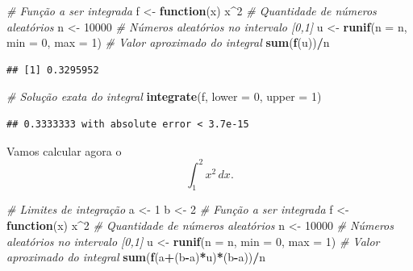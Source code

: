 \documentclass[
]{book}
\newenvironment{Shaded}{\begin{snugshade}}{\end{snugshade}}
\newcommand{\AttributeTok}[1]{\textcolor[rgb]{0.13,0.29,0.53}{#1}}
\newcommand{\CommentTok}[1]{\textcolor[rgb]{0.56,0.35,0.01}{\textit{#1}}}
\newcommand{\ControlFlowTok}[1]{\textcolor[rgb]{0.13,0.29,0.53}{\textbf{#1}}}
\newcommand{\DecValTok}[1]{\textcolor[rgb]{0.00,0.00,0.81}{#1}}
\newcommand{\FunctionTok}[1]{\textcolor[rgb]{0.13,0.29,0.53}{\textbf{#1}}}
\newcommand{\NormalTok}[1]{#1}
\newcommand{\OtherTok}[1]{\textcolor[rgb]{0.56,0.35,0.01}{#1}}
\newcommand{\SpecialCharTok}[1]{\textcolor[rgb]{0.81,0.36,0.00}{\textbf{#1}}}
\begin{document}
\begin{Shaded}
\begin{Highlighting}[]
\CommentTok{\# Função a ser integrada}
\NormalTok{f }\OtherTok{\textless{}{-}} \ControlFlowTok{function}\NormalTok{(x) x}\SpecialCharTok{\^{}}\DecValTok{2}
\CommentTok{\# Quantidade de números aleatórios}
\NormalTok{n }\OtherTok{\textless{}{-}} \DecValTok{10000}
\CommentTok{\# Números aleatórios no intervalo [0,1]}
\NormalTok{u }\OtherTok{\textless{}{-}} \FunctionTok{runif}\NormalTok{(}\AttributeTok{n =}\NormalTok{ n, }\AttributeTok{min =} \DecValTok{0}\NormalTok{, }\AttributeTok{max =} \DecValTok{1}\NormalTok{)}
\CommentTok{\# Valor aproximado do integral}
\FunctionTok{sum}\NormalTok{(}\FunctionTok{f}\NormalTok{(u))}\SpecialCharTok{/}\NormalTok{n}
\end{Highlighting}
\end{Shaded}

\begin{verbatim}
## [1] 0.3295952
\end{verbatim}

\begin{Shaded}
\begin{Highlighting}[]
\CommentTok{\# Solução exata do integral}
\FunctionTok{integrate}\NormalTok{(f, }\AttributeTok{lower =} \DecValTok{0}\NormalTok{, }\AttributeTok{upper =} \DecValTok{1}\NormalTok{)}
\end{Highlighting}
\end{Shaded}

\begin{verbatim}
## 0.3333333 with absolute error < 3.7e-15
\end{verbatim}

Vamos calcular agora o \[\int_{1}^{2} x^2\, dx.\]

\begin{Shaded}
\begin{Highlighting}[]
\CommentTok{\# Limites de integração}
\NormalTok{a }\OtherTok{\textless{}{-}} \DecValTok{1}
\NormalTok{b }\OtherTok{\textless{}{-}} \DecValTok{2}
\CommentTok{\# Função a ser integrada}
\NormalTok{f }\OtherTok{\textless{}{-}} \ControlFlowTok{function}\NormalTok{(x) x}\SpecialCharTok{\^{}}\DecValTok{2}
\CommentTok{\# Quantidade de números aleatórios}
\NormalTok{n }\OtherTok{\textless{}{-}} \DecValTok{10000}
\CommentTok{\# Números aleatórios no intervalo [0,1]}
\NormalTok{u }\OtherTok{\textless{}{-}} \FunctionTok{runif}\NormalTok{(}\AttributeTok{n =}\NormalTok{ n, }\AttributeTok{min =} \DecValTok{0}\NormalTok{, }\AttributeTok{max =} \DecValTok{1}\NormalTok{)}
\CommentTok{\# Valor aproximado do integral}
\FunctionTok{sum}\NormalTok{(}\FunctionTok{f}\NormalTok{(a}\SpecialCharTok{+}\NormalTok{(b}\SpecialCharTok{{-}}\NormalTok{a)}\SpecialCharTok{*}\NormalTok{u)}\SpecialCharTok{*}\NormalTok{(b}\SpecialCharTok{{-}}\NormalTok{a))}\SpecialCharTok{/}\NormalTok{n}
\end{Highlighting}
\end{Shaded}
\end{document}
